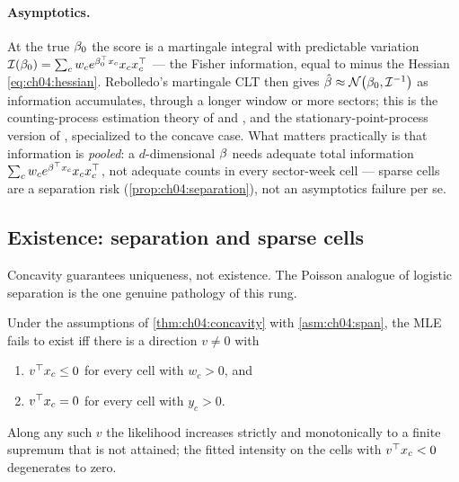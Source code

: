 \paragraph{Asymptotics.}
At the true $\beta_0$ the score is a martingale integral with predictable
variation $\mathcal{I}(\beta_0) = \sum_c w_c e^{\beta_0^{\top}x_c} x_c
x_c^{\top}$ --- the Fisher information, equal to minus the Hessian
\cref{eq:ch04:hessian}. Rebolledo's martingale CLT then gives
$\hat{\beta} \approx \mathcal{N}\big(\beta_0, \mathcal{I}^{-1}\big)$ as
information accumulates, through a longer window or more sectors; this is
the counting-process estimation theory of \citet{abgk1993} and
\citet{andersengill1982}, and the stationary-point-process version of
\citet{ogata1978}, specialized to the concave case. What matters
practically is that information is \emph{pooled}: a $d$-dimensional
$\beta$ needs adequate total information $\sum_c w_c
e^{\beta^{\top}x_c}x_cx_c^{\top}$, not adequate counts in every
sector-week cell --- sparse cells are a separation risk
(\cref{prop:ch04:separation}), not an asymptotics failure per se.

\subsection{Existence: separation and sparse cells}\label{ch04:sec:separation}

Concavity guarantees uniqueness, not existence. The Poisson analogue of
logistic separation is the one genuine pathology of this rung.

\begin{proposition}\label{prop:ch04:separation}
Under the assumptions of \cref{thm:ch04:concavity} with
\cref{asm:ch04:span}, the MLE fails to exist iff there is a direction
$v \neq 0$ with
\begin{enumerate}[label=(\roman*)]
\item $v^{\top} x_c \le 0$ for every cell with $w_c > 0$, and
\item $v^{\top} x_c = 0$ for every cell with $y_c > 0$.
\end{enumerate}
Along any such $v$ the likelihood increases strictly and monotonically to
a finite supremum that is not attained; the fitted intensity on the cells
with $v^{\top}x_c < 0$ degenerates to zero.
\end{proposition}

